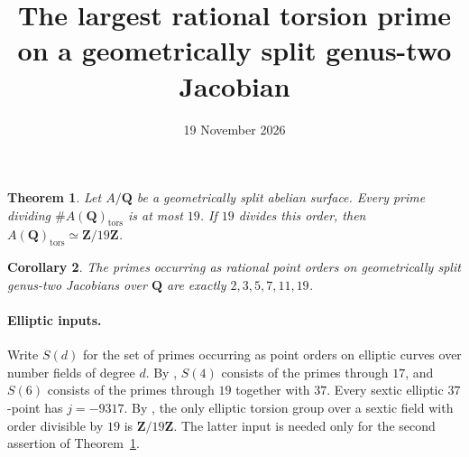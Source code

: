 \documentclass[10pt]{article}
\title{The largest rational torsion prime on a geometrically split genus-two Jacobian}
\author{}
\date{19 November 2026}
\newcommand{\Q}{\mathbf Q}
\newcommand{\Z}{\mathbf Z}
\newtheorem{theorem}{Theorem}
\newtheorem{corollary}[theorem]{Corollary}
\begin{document}
\maketitle

\begin{theorem}\label{main}
Let \(A/\Q\) be a geometrically split abelian surface. Every prime dividing \(\#A(\Q)_{\mathrm{tors}}\) is at most \(19\). If \(19\) divides this order, then \(A(\Q)_{\mathrm{tors}}\simeq\Z/19\Z\).
\end{theorem}
\begin{corollary}
The primes occurring as rational point orders on geometrically split genus-two Jacobians over \(\Q\) are exactly \(2,3,5,7,11,19\).
\end{corollary}

\paragraph{Elliptic inputs.}
Write \(S(d)\) for the set of primes occurring as point orders on elliptic curves over number fields of degree \(d\). By \cite[Theorem 1.2 and Proposition 1.4]{DKSS}, \(S(4)\) consists of the primes through \(17\), and \(S(6)\) consists of the primes through \(19\) together with \(37\). Every sextic elliptic \(37\)-point has \(j=-9317\). By \cite[Theorem 1.1]{sextic}, the only elliptic torsion group over a sextic field with order divisible by \(19\) is \(\Z/19\Z\). The latter input is needed only for the second assertion of Theorem~\ref{main}.
\end{document}
